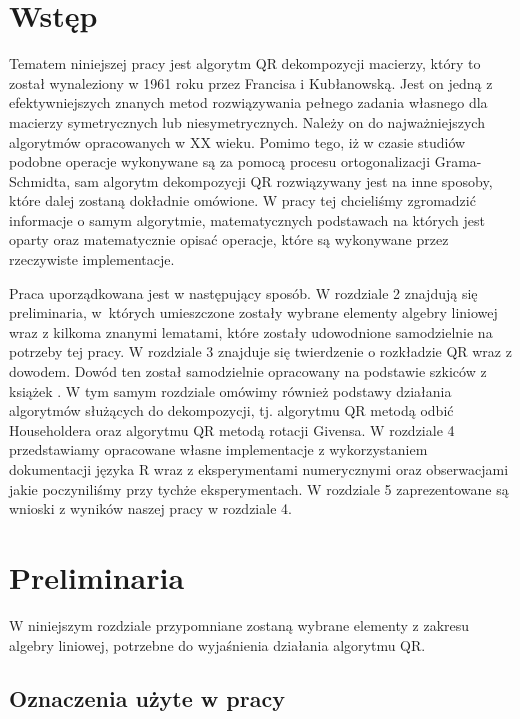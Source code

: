 \documentclass[12pt,a4paper]{report}
\begin{document}
\chapter{Wstęp}
Tematem niniejszej pracy jest algorytm QR dekompozycji macierzy, który to został wynaleziony w 1961 roku przez Francisa i Kubłanowską. Jest on jedną z efektywniejszych znanych metod rozwiązywania pełnego zadania własnego dla macierzy symetrycznych lub niesymetrycznych. Należy on do najważniejszych algorytmów opracowanych w XX wieku. Pomimo tego, iż w czasie studiów podobne operacje wykonywane są za pomocą procesu ortogonalizacji Grama-Schmidta, sam algorytm dekompozycji QR rozwiązywany jest na inne sposoby, które dalej zostaną dokładnie omówione. W pracy tej chcieliśmy zgromadzić informacje o samym algorytmie, matematycznych podstawach na których jest oparty oraz matematycznie opisać operacje, które są wykonywane przez rzeczywiste implementacje.

Praca uporządkowana jest w następujący sposób. W rozdziale 2 znajdują się preliminaria, w~których umieszczone zostały wybrane elementy algebry liniowej wraz z kilkoma znanymi lematami, które zostały udowodnione samodzielnie na potrzeby tej pracy. W rozdziale 3 znajduje się twierdzenie o rozkładzie QR wraz z dowodem. Dowód ten został samodzielnie opracowany na podstawie szkiców z książek \citep{bjorck14,demmel12,poreda11,wilkinson13}. W tym samym rozdziale omówimy również podstawy działania algorytmów służących do dekompozycji, tj. algorytmu QR metodą odbić Householdera oraz algorytmu QR metodą rotacji Givensa. W rozdziale 4 przedstawiamy opracowane własne implementacje z wykorzystaniem dokumentacji języka R \citep{dokumentacjaR} wraz z eksperymentami numerycznymi oraz obserwacjami jakie poczyniliśmy przy tychże eksperymentach. W rozdziale 5 zaprezentowane są wnioski z wyników naszej pracy w rozdziale 4. 










\chapter{Preliminaria}

W niniejszym rozdziale przypomniane zostaną wybrane elementy z zakresu algebry liniowej, potrzebne do wyjaśnienia działania algorytmu QR. 
 
\section{Oznaczenia użyte w pracy}
\end{document}
